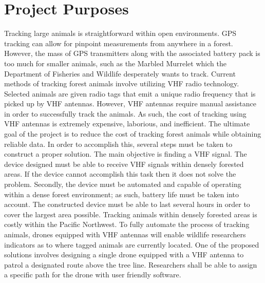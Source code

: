 \documentclass[onecolumn, draftclsnofoot,10pt, compsoc]{IEEEtran}
\begin{document}
\section{Project Purposes}
Tracking large animals is straightforward within open environments. GPS tracking can allow for pinpoint measurements from anywhere in a forest. However, the mass of GPS transmitters along with the associated battery pack is too much for smaller animals, such as the Marbled Murrelet which the Department of Fisheries and Wildlife desperately wants to track. Current methods of tracking forest animals involve utilizing VHF radio technology. Selected animals are given radio tags that emit a unique radio frequency that is picked up by VHF antennas. However, VHF antennas require manual assistance in order to successfully track the animals. As such, the cost of tracking using VHF antennas is extremely expensive, laborious, and inefficient. The ultimate goal of the project is to reduce the cost of tracking forest animals while obtaining reliable data. In order to accomplish this, several steps must be taken to construct a proper solution. The main objective is finding a VHF signal. The device designed must be able to receive VHF signals within densely forested areas. If the device cannot accomplish this task then it does not solve the problem. Secondly, the device must be automated and capable of operating within a dense forest environment; as such, battery life must be taken into account. The constructed device must be able to last several hours in order to cover the largest area possible.
\newline\newline 
Tracking animals within densely forested areas is costly within the Pacific Northwest. To fully automate the process of tracking animals, drones equipped with VHF antennas will enable wildlife researchers indicators as to where tagged animals are currently located. One of the proposed solutions involves designing a single drone equipped with a VHF antenna to patrol a designated route above the tree line. Researchers shall be able to assign a specific path for the drone with user friendly software. %
\end{document}
